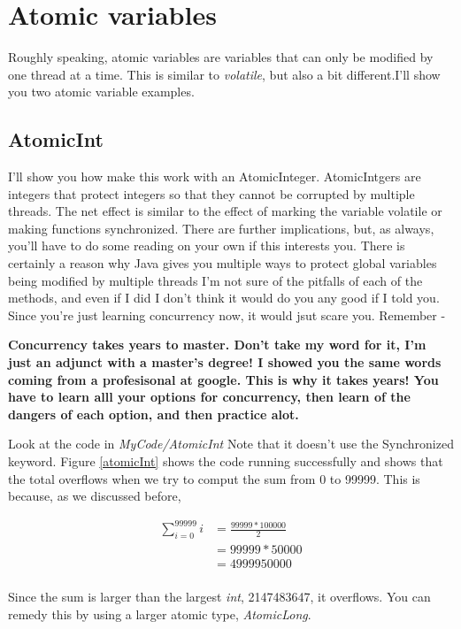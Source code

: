 \documentclass[12pt]{article}
\begin{document}
\section{Atomic variables}
Roughly speaking, atomic variables are variables that can only be modified by
one thread at a time. This is similar to \textit{volatile}, but also a bit
different.I'll show you two atomic variable examples.
\subsection{ AtomicInt }
I'll show you how make this work with an AtomicInteger. AtomicIntgers are
integers that protect integers so that they cannot be corrupted by multiple
threads. The net effect is similar to the effect of marking the variable
volatile or making functions synchronized. There are further implications, but,
as always, you'll have to do some reading on your own if this interests you.
There is certainly a reason why Java gives you multiple ways to protect global
variables being modified by multiple threads I'm not sure of the pitfalls of
each of the methods, and even if I did I don't think it would do you any good if
I told you. Since you're just learning concurrency now, it would jsut scare you.
Remember -

\begin{center}
{\Large\textbf{Concurrency takes years to master. Don't take my word for it, I'm
just an adjunct with a master's degree! I showed you the same words coming from
a profesisonal at google. This is why it takes years! You have to learn alll
your options for concurrency, then learn of the dangers of each option, and then
practice alot.}}
\end{center} 
Look at the code in \textit{MyCode/AtomicInt}
Note that it doesn't use the Synchronized keyword. Figure \ref{atomicInt} shows
the code running successfully and shows that the total overflows when we try to
comput the sum from 0 to 99999. This is because, as we discussed before, 

\begin{align*}
\sum_{i=0}^{99999}i &= \frac{99999*100000}{2}\\
					&= 99999 * 50000\\
					&= 4999950000\\
\end{align*}

Since the sum is larger than the largest \textit{int}, 2147483647, it overflows.
You can remedy this by using a larger atomic type, \textit{AtomicLong}.
\end{document}
